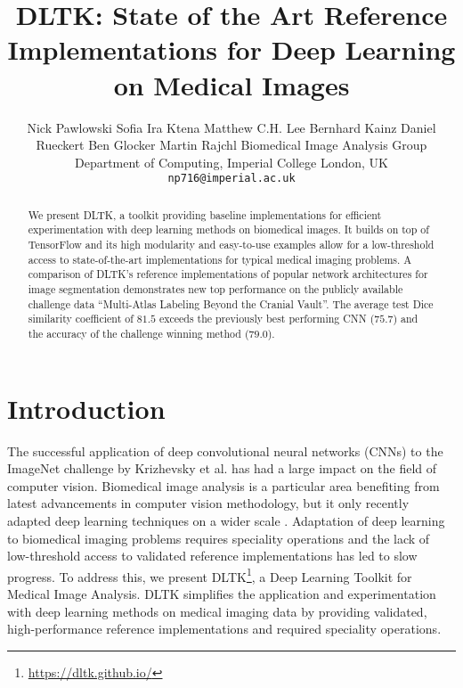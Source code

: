 \documentclass{article}
\title{DLTK: State of the Art Reference Implementations for Deep Learning on Medical Images} %
\author{Nick Pawlowski \And Sofia Ira Ktena \And Matthew C.H. Lee \AND Bernhard Kainz \And Daniel Rueckert \And Ben Glocker \And Martin Rajchl \AND
Biomedical Image Analysis Group\\Department of Computing, Imperial College London, UK\\
\texttt{np716@imperial.ac.uk}
}
\begin{document}
\maketitle

\begin{abstract}
We present DLTK, a toolkit providing baseline implementations for efficient experimentation with deep learning methods on biomedical images. It builds on top of TensorFlow and its high modularity and easy-to-use examples allow for a low-threshold access to state-of-the-art implementations for typical medical imaging problems. A comparison of DLTK's reference implementations of popular network architectures for image segmentation demonstrates new top performance on the publicly available challenge data ``Multi-Atlas Labeling Beyond the Cranial Vault''. The average test Dice similarity coefficient of $81.5$ exceeds the previously best performing CNN ($75.7$) and the accuracy of the challenge winning method ($79.0$).
\end{abstract}

\section{Introduction}
The successful application of deep convolutional neural networks (CNNs) to the ImageNet challenge \cite{Russakovsky2015} by Krizhevsky et al. \cite{Krizhevsky2012} has had a large impact on the field of computer vision. Biomedical image analysis is a particular area benefiting from latest advancements in computer vision methodology, but it only recently adapted deep learning techniques on a wider scale \cite{Litjens2017}.
Adaptation of deep learning to biomedical imaging problems requires speciality operations and the lack of low-threshold access to validated reference implementations has led to slow progress. To address this, we present DLTK\footnote{\url{https://dltk.github.io/}}, a Deep Learning Toolkit for Medical Image Analysis. DLTK simplifies the application and experimentation with deep learning methods on medical imaging data by providing validated, high-performance reference implementations and required speciality operations.
\end{document}
